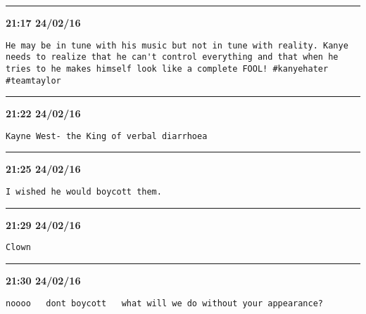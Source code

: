 \hrule%

\begin{adjustwidth}{0cm}{0cm}
\footnotesize \textbf{21:17 24/02/16}

\begin{lstlisting}[breaklines, breakatwhitespace, basicstyle=\small, frame=leftline]
He may be in tune with his music but not in tune with reality. Kanye needs to realize that he can't control everything and that when he tries to he makes himself look like a complete FOOL! #kanyehater #teamtaylor
\end{lstlisting}
\end{adjustwidth}

\hrule%

\begin{adjustwidth}{0cm}{0cm}
\footnotesize \textbf{21:22 24/02/16}

\begin{lstlisting}[breaklines, breakatwhitespace, basicstyle=\small, frame=leftline]
Kayne West- the King of verbal diarrhoea
\end{lstlisting}
\end{adjustwidth}

\hrule%

\begin{adjustwidth}{0cm}{0cm}
\footnotesize \textbf{21:25 24/02/16}

\begin{lstlisting}[breaklines, breakatwhitespace, basicstyle=\small, frame=leftline]
I wished he would boycott them.
\end{lstlisting}
\end{adjustwidth}

\hrule%

\begin{adjustwidth}{0cm}{0cm}
\footnotesize \textbf{21:29 24/02/16}

\begin{lstlisting}[breaklines, breakatwhitespace, basicstyle=\small, frame=leftline]
Clown
\end{lstlisting}
\end{adjustwidth}

\hrule%

\begin{adjustwidth}{0cm}{0cm}
\footnotesize \textbf{21:30 24/02/16}

\begin{lstlisting}[breaklines, breakatwhitespace, basicstyle=\small, frame=leftline]
noooo   dont boycott   what will we do without your appearance?
\end{lstlisting}
\end{adjustwidth}

